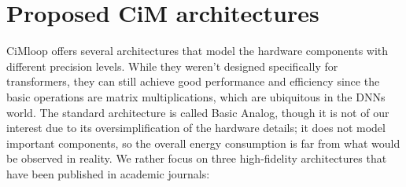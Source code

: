 \documentclass[conference]{IEEEtran}
\begin{document}
\section{Proposed CiM architectures}
CiMloop offers several architectures that model the hardware components with different precision levels. While they weren't designed specifically for transformers, they can still achieve good performance and efficiency since the basic operations are matrix multiplications, which are ubiquitous in the DNNs world. The standard architecture is called Basic Analog, though it is not of our interest due to its oversimplification of the hardware details; it does not model important components, so the overall energy consumption is far from what would be observed in reality. We rather focus on three high-fidelity architectures that have been published in academic journals:
\end{document}

